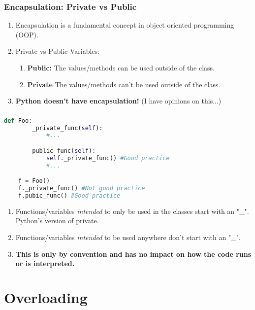 \documentclass{beamer}
\begin{document}
%
%
\begin{frame}[fragile]
    \frametitle{Encapsulation: Private vs Public}
    \vfill
    \begin{enumerate}[A]
        \item Encapsulation is a fundamental concept in object oriented programming (OOP).
        \pause
        \item Private vs Public Variables:
        \pause
        \begin{enumerate}[A]
            \item \textbf{Public: } The values/methods can be used outside of the class.
        \pause
            \item \textbf{Private } The values/methods can't be used outside of the class.
        \pause
        \end{enumerate}
    \item \textbf{Python doesn't have encapsulation!} (I have opinions on this...)
    \end{enumerate}
    \vfill
\end{frame}

%
%
\begin{frame}[fragile]
    \frametitle{}
    \begin{lstlisting}[language=Python, autogobble]
    def Foo:
        _private_func(self):
            #...

        public_func(self):
            self._private_func() #Good practice
            #...

    f = Foo()
    f._private_func() #Not good practice
    f.pubic_func() #Good practice
    \end{lstlisting}
    \vfill
    \begin{enumerate}[A]
        \pause
        \item Functions/variables \textit{intended} to only be used in the classes start with an "\_". Python's version of private.
        \pause
        \item Functions/variables \textit{intended} to be used anywhere don't start with an "\_".
        \pause
        \item \textbf{This is only by convention and has no impact on how the code runs or is interpreted.}
    \end{enumerate}
\end{frame}

\section{Overloading}
\end{document}
